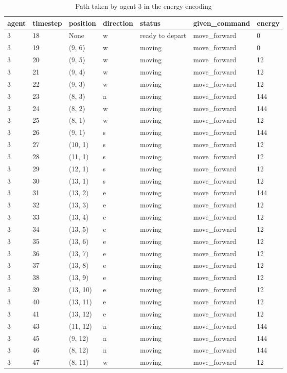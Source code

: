 \documentclass[12pt, a4paper]{llncs}
\begin{document}
\begin{table}[htbp]
  \centering
  \caption{Path taken by agent 3 in the energy encoding}
  \label{tab:energy3}
  \begin{tabular}{lllllll}
    \toprule
    agent & timestep & position & direction & status & given\_command & energy \\
    \midrule
3 & 18 & None & w & ready to depart & move\_forward & 0 \\
3 & 19 & (9, 6) & w & moving & move\_forward & 0 \\
3 & 20 & (9, 5) & w & moving & move\_forward & 12 \\
3 & 21 & (9, 4) & w & moving & move\_forward & 12 \\
3 & 22 & (9, 3) & w & moving & move\_forward & 12 \\
3 & 23 & (8, 3) & n & moving & move\_forward & 144 \\
3 & 24 & (8, 2) & w & moving & move\_forward & 144 \\
3 & 25 & (8, 1) & w & moving & move\_forward & 12 \\
3 & 26 & (9, 1) & s & moving & move\_forward & 144 \\
3 & 27 & (10, 1) & s & moving & move\_forward & 12 \\
3 & 28 & (11, 1) & s & moving & move\_forward & 12 \\
3 & 29 & (12, 1) & s & moving & move\_forward & 12 \\
3 & 30 & (13, 1) & s & moving & move\_forward & 12 \\
3 & 31 & (13, 2) & e & moving & move\_forward & 144 \\
3 & 32 & (13, 3) & e & moving & move\_forward & 12 \\
3 & 33 & (13, 4) & e & moving & move\_forward & 12 \\
3 & 34 & (13, 5) & e & moving & move\_forward & 12 \\
3 & 35 & (13, 6) & e & moving & move\_forward & 12 \\
3 & 36 & (13, 7) & e & moving & move\_forward & 12 \\
3 & 37 & (13, 8) & e & moving & move\_forward & 12 \\
3 & 38 & (13, 9) & e & moving & move\_forward & 12 \\
3 & 39 & (13, 10) & e & moving & move\_forward & 12 \\
3 & 40 & (13, 11) & e & moving & move\_forward & 12 \\
3 & 41 & (13, 12) & e & moving & move\_forward & 12 \\
3 & 43 & (11, 12) & n & moving & move\_forward & 144 \\
3 & 45 & (9, 12) & n & moving & move\_forward & 144 \\
3 & 46 & (8, 12) & n & moving & move\_forward & 144 \\
3 & 47 & (8, 11) & w & moving & move\_forward & 12 \\
    \bottomrule
  \end{tabular}
\end{table}
\end{document}
